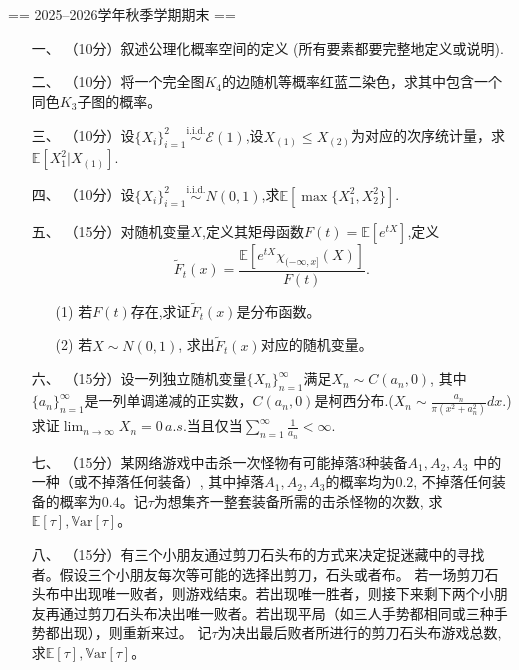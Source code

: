 \newcommand{\Cov}{\mathbb{C}\mathrm{ov}}
\newcommand{\p}{\mathbb{P}}
\newcommand{\Var}{\mathbb{V}\mathrm{ar}}
\newcommand{\e}{\mathbb{E}}
\newcommand {\simiid} {\stackrel{\mathrm{i.i.d.}}{\sim}}
\def \H {\mathrm{H}}
\def \T {\mathrm{T}}

== 2025--2026学年秋季学期期末 ==
\begin{itemize}
    \item [一、]（10分）叙述公理化概率空间的定义 (所有要素都要完整地定义或说明).

    \item [二、]（10分）将一个完全图\(K_4\)的边随机等概率红蓝二染色，求其中包含一个同色\(K_3\)子图的概率。

    \item [三、]（10分）设\(\{X_i\}_{i=1}^2\stackrel{\mathrm{i.i.d.}}{\sim} \mathcal{E}(1)\),设\(X_{(1)} \leq X_{(2)}\)为对应的次序统计量，求\(\e[X_1^2|X_{(1)}]\).

    \item [四、]（10分）设\(\{X_i\}_{i=1}^2\stackrel{\mathrm{i.i.d.}}{\sim} N(0,1)\),求\(\e[\max \{X_1^2,X_2^2\}]\).

    \item [五、]（15分）对随机变量\(X\),定义其矩母函数\(F(t) = \e [e^{tX}]\),定义
    \[
        \tilde {F}_t(x)=\frac{\e [e^{tX}\chi_{(-\infty,x]}(X)]}{F(t)}.
    \]
    \begin{itemize}
        \item [(1)]若\(F(t)\)存在,求证\(\tilde{F}_t(x)\)是分布函数。
        \item [(2)]若\(X \sim N(0,1)\), 求出\(\tilde{F}_t(x)\)对应的随机变量。
    \end{itemize}

    \item [六、]（15分）设一列独立随机变量\(\{X_n\}_{n=1}^{\infty}\)满足\(X_n \sim C(a_n,0)\),
    其中\(\{a_n\}_{n=1}^{\infty}\)是一列单调递减的正实数，\(C(a_n,0)\)是柯西分布.(\(X_n \sim \frac{a_n}{\pi(x^2+a_n^2)}dx.\))
    求证\(\lim_{n \to \infty}X_n = 0 \, a.s.\)当且仅当\(\sum_{n=1}^{\infty}\frac{1}{a_n} < \infty \).

    \item [七、]（15分）某网络游戏中击杀一次怪物有可能掉落$3$种装备$A_1, A_2,A_3$
    中的一种（或不掉落任何装备）, 其中掉落$A_1,A_2,A_3$的概率均为$0.2$, 
    不掉落任何装备的概率为$0.4$。记$\tau$为想集齐一整套装备所需的击杀怪物的次数, 
    求$\e[\tau],\Var[\tau]$。

    \item [八、]（15分）有三个小朋友通过剪刀石头布的方式来决定捉迷藏中的寻找者。假设三个小朋友每次等可能的选择出剪刀，石头或者布。
    若一场剪刀石头布中出现唯一败者，则游戏结束。若出现唯一胜者，则接下来剩下两个小朋友再通过剪刀石头布决出唯一败者。若出现平局（如三人手势都相同或三种手势都出现），则重新来过。
    记$\tau$为决出最后败者所进行的剪刀石头布游戏总数, 求$\e[\tau],\Var[\tau]$。

\end{itemize}

